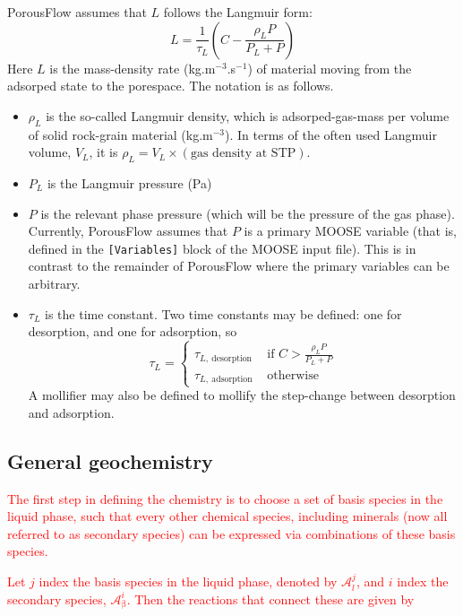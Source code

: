 \documentclass[12pt]{report}
\def\phase{\mathrm{\beta}}
\begin{document}
PorousFlow assumes that $L$ follows the Langmuir form:
\begin{equation}
L = \frac{1}{\tau_{L}}\left(C - \frac{\rho_{L}P}{P_{L}+P} \right)
\end{equation}
Here $L$ is the mass-density rate (kg.m$^{-3}$.s$^{-1}$) of material
moving from the adsorped state to the porespace.  The notation is as
follows.
\begin{itemize}
\item $\rho_{L}$ is the so-called Langmuir density, which is
  adsorped-gas-mass per volume of solid rock-grain material (kg.m$^{-3}$).  In
  terms of the often used Langmuir volume, $V_{L}$, it is
  $\rho_{L}=V_{L}\times(\mbox{gas density at STP})$.
\item $P_{L}$ is the Langmuir pressure (Pa)
\item $P$ is the relevant phase pressure (which will be the pressure
  of the gas phase).  Currently, PorousFlow assumes that $P$ is a
  primary MOOSE variable (that is, defined in the {\tt [Variables]}
  block of the MOOSE input file).  This is in contrast to the
  remainder of PorousFlow where the primary variables can be
  arbitrary.
\item $\tau_{L}$ is the time constant.  Two time constants may be
  defined: one for desorption, and one for adsorption, so
\begin{equation}
\tau_{L} = \left\{
\begin{array}{ll}
\tau_{L,\ \mathrm{desorption}} & \mbox{ if }
C>\frac{\rho_{L}P}{P_{L}+P} \\
\tau_{L,\ \mathrm{adsorption}} & \mbox{ otherwise}
\end{array}
\right.
\end{equation}
A mollifier may also be defined to mollify the step-change between
desorption and adsorption.
\end{itemize}



\subsection{General geochemistry}
\label{geochem.sec}

\textcolor{red}{
The first step in defining the chemistry is to choose a set of basis
species  in the liquid phase, such that every other chemical species,
including minerals (now all referred to as secondary species) can be
expressed via combinations of these basis  species.}

\textcolor{red}{
Let $j$ index the basis species in the liquid phase, denoted by
$\mathcal{A}^{j}_{l}$, and $i$ index the secondary species,
$\mathcal{A}^{i}_{\phase}$. Then the reactions that connect these are
given by
}
\end{document}
